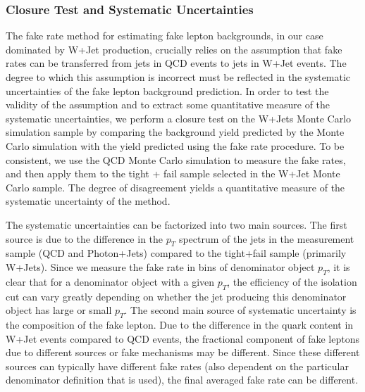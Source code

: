 \subsubsection{Closure Test and Systematic Uncertainties}
\label{sec:fakerateSystematics}

The fake rate method for estimating fake lepton backgrounds, in our case
dominated by W+Jet production, crucially relies on the assumption that
fake rates can be transferred from jets in QCD events to jets in W+Jet
events. The degree to which this assumption is incorrect must be 
reflected in the systematic uncertainties of the fake lepton 
background prediction. In order to test the validity of the assumption
and to extract some quantitative measure of the systematic uncertainties,
we perform a closure test on the W+Jets Monte Carlo simulation sample by 
comparing the background yield predicted by the Monte Carlo simulation
with the yield predicted using the fake rate procedure. To be consistent,
we use the QCD Monte Carlo simulation to measure the fake rates, and then
apply them to the tight + fail sample selected in the W+Jet Monte Carlo
sample. The degree of disagreement yields a quantitative measure of the 
systematic uncertainty of the method. 

The systematic uncertainties can be factorized into two main sources. 
The first source is due to the difference in the $p_{T}$ spectrum 
of the jets in the measurement sample (QCD and Photon+Jets) compared
to the tight+fail sample (primarily W+Jets). Since we measure the 
fake rate in bins of denominator object $p_{T}$, it is clear that
for a denominator object with a given $p_{T}$, the efficiency of the
isolation cut can vary greatly depending on whether the jet producing
this denominator object has large or small $p_{T}$. The second main
source of systematic uncertainty is the composition of the fake lepton.
Due to the difference in the quark content in W+Jet events compared
to QCD events, the fractional component of fake leptons due to different 
sources or fake mechanisms may be different. Since these different sources
can typically have different fake rates (also dependent on the particular 
denominator definition that is used), the final averaged fake rate can 
be different.

